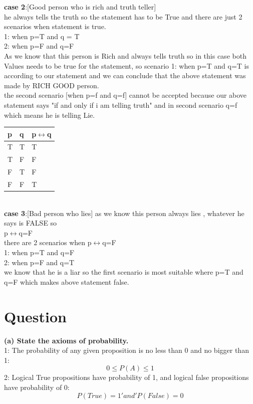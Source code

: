 \documentclass[12pt,a4paper]{article}
\begin{document}
\textbf{case 2}:[Good person who is rich and truth teller]\\

he always tells the truth so the statement has to be True and there are just 2 scenarios when statement is true.\\

1: when p=T  and q = T \\
2: when p=F and q=F \\

As we know that this person is Rich and always tells truth so in this case both Values needs to be true for the statement, so scenario 1: when p=T and q=T is according to our statement and we can conclude that the above statement was made by RICH GOOD person.\\
the second scenario [when p=f and q=f] cannot be accepted because our above statement says "if and only if i am telling truth" and in second scenario q=f which means he is telling Lie.
\begin{tabular} {|l|l||l|}
	
	\hline
	\hline
	p&q&	p$\leftrightarrow$q \\
	\hline
	\hline

	T&T&T \\
	T&F&F \\
	F&T&F \\
	F&F&T \\
	
	
\end{tabular}\\


	\textbf{case 3}:[Bad person who lies]
	as we know this person always lies , whatever he says is FALSE so\\
	p$\leftrightarrow$q=F\\
	there are 2 scenarios when 	p$\leftrightarrow$q=F\\
	1: when p=T and q=F\\
	2: when p=F and q=T \\
	
	we know that he is a liar so the first scenario is most suitable where p=T and q=F which makes above statement false.
	




		
	\section{Question}
	
    \textbf{(a)	State the axioms of probability.}\\
    1: The probability of any given proposition is no less than 0 and no bigger than 1:
    	\begin{equation}
    	0\leqslant P(A) \leqslant 1
    	\end{equation}
    2: Logical True propositions have probability of 1, and logical false propositions have probability of 0:
  \begin{equation}
  P(True) = 1   'and'   P(False) = 0
  \end{equation}
  
\end{document}
